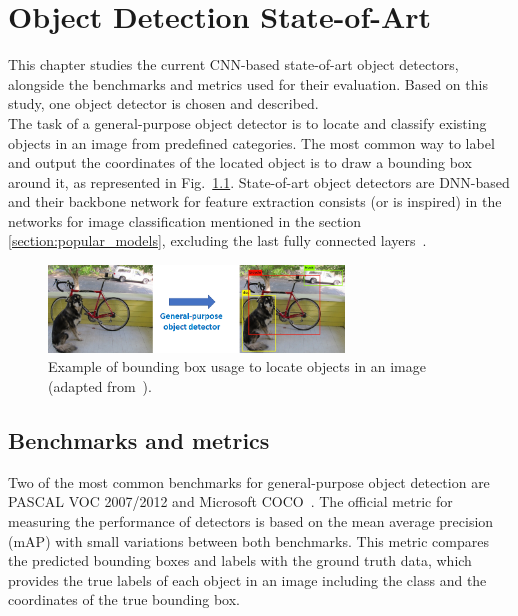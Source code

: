 \chapter{Object Detection State-of-Art}
\label{chapter:object_detection}

This chapter studies the current CNN-based state-of-art object detectors, alongside the benchmarks and metrics used for their evaluation. Based on this study, one object detector is chosen and described.\\

\vspace{-0.4cm}
The task of a general-purpose object detector is to locate and classify existing objects in an image from predefined categories. The most common way to label and output the coordinates of the located object is to draw a bounding box around it, as represented in Fig.~\ref{fig:bounding_box}. State-of-art object detectors are DNN-based and their backbone network for feature extraction consists (or is inspired) in the networks for image classification mentioned in the section \ref{section:popular_models}, excluding the last fully connected layers~\cite{jiao:obj_survey}.   

\begin{figure}[!htb]
  \centering
  \includegraphics[width=0.7\textwidth]{Figures/bounding_box.png}
  \caption{Example of bounding box usage to locate objects in an image (adapted from~\cite{Redmon2015YouOL}).}
  \label{fig:bounding_box}
\end{figure}
\vspace{-0.2cm}

\section{Benchmarks and metrics}
\label{section:benchmarks}

Two of the most common benchmarks for general-purpose object detection are PASCAL VOC 2007/2012 and Microsoft COCO~\cite{zhao:obj_survey}. The official metric for measuring the performance of detectors is based on the mean average precision (mAP) with small variations between both benchmarks. This metric compares the predicted bounding boxes and labels with the ground truth data, which provides the true labels of each object in an image including the class and the coordinates of the true bounding box.   

